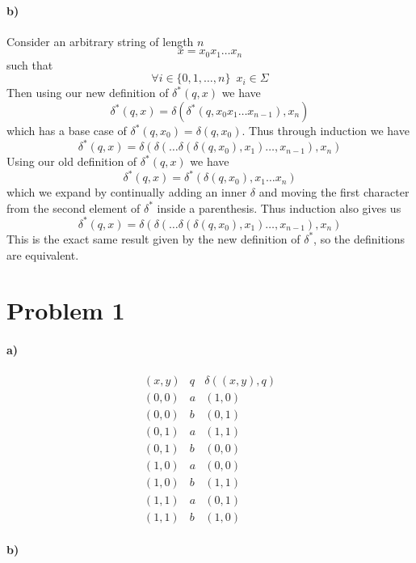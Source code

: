 \documentclass[12pt]{article}
\begin{document}
\paragraph{b)}

Consider an arbitrary string of length \(n\)
\[x=x_0x_1\ldots x_n\]
such that
\[\forall i\in \{0,1,\ldots,n\} \enspace x_i\in\Sigma\]
Then using our new definition of \(\delta^*(q,x)\) we have
\[\delta^*(q,x)=\delta(\delta^*(q,x_0x_1\ldots x_{n-1}), x_n)\]
which has a base case of \(\delta^*(q,x_0)=\delta(q,x_0)\). Thus through induction we have
\[\delta^*(q,x)=\delta(\delta(\ldots\delta(\delta(q,x_0),x_1)\ldots,x_{n-1}), x_n)\]
Using our old definition of \(\delta^*(q,x)\) we have
\[\delta^*(q,x)=\delta^*(\delta(q,x_0),x_1\ldots x_n)\]
which we expand by continually adding an inner \(\delta\) and moving the first character from the second
element of \(\delta^*\) inside a parenthesis. Thus induction also gives us
\[\delta^*(q,x)=\delta(\delta(\ldots\delta(\delta(q,x_0),x_1)\ldots,x_{n-1}), x_n)\]
This is the exact same result given by the new definition of \(\delta^*\), so the definitions are equivalent.

\section*{Problem 1}

\paragraph{a)}

\[
        \begin{array}{c|c|c}
                (x,y) & q & \delta((x,y),q)\\
                \hline
                (0,0) & a & (1,0)\\
                (0,0) & b & (0,1)\\
                (0,1) & a & (1,1)\\
                (0,1) & b & (0,0)\\
                (1,0) & a & (0,0)\\
                (1,0) & b & (1,1)\\
                (1,1) & a & (0,1)\\
                (1,1) & b & (1,0)
        \end{array}
\]

\paragraph{b)}
\end{document}
